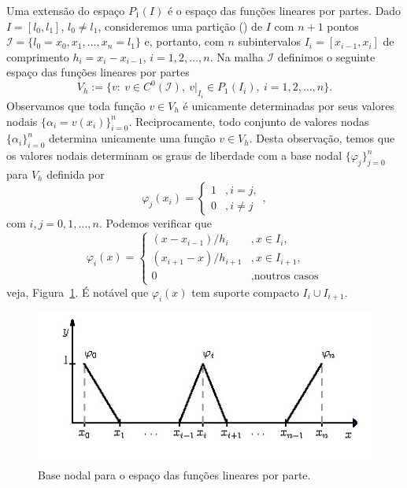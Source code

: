 Uma extensão do espaço $P_1(I)$ é o espaço das funções lineares por partes. Dado $I = [l_0, l_1]$, $l_0\neq l_1$, consideremos uma partição () de $I$ com $n+1$ pontos $\mathcal{I} = \{l_0=x_0, x_1, \dotsc, x_n=l_1\}$ e, portanto, com $n$ subintervalos $I_i=[x_{i-1}, x_{i}]$ de comprimento $h_i = x_i-x_{i-1}$, $i=1, 2, \dotsc, n$. Na malha $\mathcal{I}$ definimos o seguinte espaço das funções lineares por partes
\begin{equation}
  V_h := \{v:~v\in C^0(\mathcal{I}),~v|_{I_i}\in P_1(I_i),~i=1,2,\dotsc,n\}.
\end{equation}
Observamos que toda função $v\in V_h$ é unicamente determinadas por seus valores nodais $\{\alpha_i = v(x_i)\}_{i=0}^n$. Reciprocamente, todo conjunto de valores nodas $\{\alpha_i\}_{i=0}^n$ determina unicamente uma função $v\in V_h$. Desta observação, temos que os valores nodais determinam os graus de liberdade com a base nodal $\{\varphi_j\}_{j=0}^n$ para $V_h$ definida por
\begin{equation}
  \varphi_j(x_i) = \left\{
    \begin{array}{ll}
      1 &, i=j,\\
      0 &, i\neq j
    \end{array}
\right.,
\end{equation}
com $i,j=0,1,\dotsc,n$. Podemos verificar que
\begin{equation}
  \varphi_i(x) = \left\{
    \begin{array}{ll}
      (x-x_{i-1})/h_i &, x\in I_i,\\
      (x_{i+1}-x)/h_{i+1} &, x\in I_{i+1},\\
      0 &, \text{noutros casos}
    \end{array}
\right.
\end{equation}
veja, Figura~\ref{fig:baselinear}. É notável que $\varphi_i(x)$ tem suporte compacto $I_i\cup I_{i+1}$.

\begin{figure}[h!]
  \centering
  \includegraphics[width=\textwidth]{./cap_mef1d/dados/fig_baselinear/fig_baselinear}
  \caption{Base nodal para o espaço das funções lineares por parte.}
  \label{fig:baselinear}
\end{figure}

